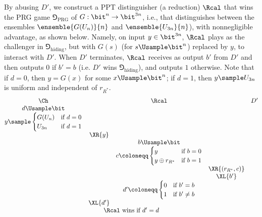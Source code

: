 \begin{answer}[b]
    By abusing $D'$, we construct a PPT distinguisher (a reduction) $\Rcal$ that wins the  PRG game $\Game_{\textrm{PRG}}$ of $G:\bit^n\to\bit^{3n}$, i.e., that distinguishes between the ensembles $\ensemble{G(U_n)}{n}$ and $\ensemble{U_{3n}}{n}$), with nonnegligible advantage, as shown below.
    Namely, on input $y\in\bit^{3n}$, $\Rcal$ plays as the challenger in $\Game_{\textrm{hiding}}$, but with $G(s)$ (for $s \Usample \bit^n$) replaced by $y$, to interact with $D'$. When $D'$ terminates, $\Rcal$ receives as output $b'$ from $D'$ and then outputs $0$ if $b'=b$ (i.e. $D'$ wins $\Game_{\textrm{hiding}}$), and outputs $1$ otherwise. Note that if $d=0$, then $y=G(x)$ for some $x \Usample \bit^n$; if $d=1$, then $y\sample U_{3n}$ is uniform and independent of $r_{R^\ast}$.
    {
        \[
            \begin{array}{@{} c c c c c@{}}
            \Ch & & \Rcal & & D' \\
            d\Usample\bit & &  & & \\
            y \sample \begin{cases}
                G(U_n) &\textrm{if } d=0\\
                U_{3n} &\textrm{if } d=1
            \end{cases} & & & & \\
            & \XR{y} & &  & \\
            & & b \Usample \bit & & \\
            & & c\coloneqq \begin{cases} 
                y &\textrm{if } b = 0 \\
                y\oplus r_{R^\ast} &\textrm{if } b = 1 
            \end{cases} & &\\
            & & & \XR{(r_{R^\ast}, c)} & \\
            & & & \XL{b'} & \\
            & & d'\coloneqq \begin{cases}
                0 &\textrm{if } b'=b\\
                1 &\textrm{if } b'\neq b 
            \end{cases} & & \\
            & \XL{d'} & & & \\
            \multicolumn{5}{c}{\text{$\Rcal$ wins if $d' = d$}}
            \end{array}
        \]
        \label{fig:p6-game2}
    }


\end{answer}
